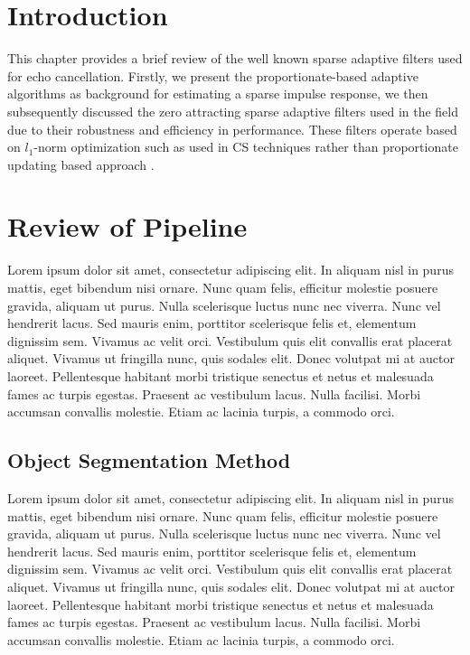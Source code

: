 \section{Introduction}\label{sec:4.1}
\vspace{-0.5cm}
\noindent This chapter provides a brief review of the well known sparse adaptive filters used for echo cancellation. Firstly, we present the proportionate-based adaptive algorithms as background for estimating a sparse impulse response, we then subsequently discussed the zero attracting sparse adaptive filters used in the field due to their robustness and efficiency in performance. These filters operate based on $l_1$-norm optimization such as used in CS techniques \cite{Dohono} rather than proportionate updating based approach \cite{Duttweiler}.

\vspace{-0.3cm}




\section{Review of Pipeline}\label{sec:4.2}
\vspace{-0.5cm}
\noindent Lorem ipsum dolor sit amet, consectetur adipiscing elit. In aliquam nisl in purus mattis, eget bibendum nisi ornare. Nunc quam felis, efficitur molestie posuere gravida, aliquam ut purus. Nulla scelerisque luctus nunc nec viverra. Nunc vel hendrerit lacus. Sed mauris enim, porttitor scelerisque felis et, elementum dignissim sem. Vivamus ac velit orci. Vestibulum quis elit convallis erat placerat aliquet. Vivamus ut fringilla nunc, quis sodales elit. Donec volutpat mi at auctor laoreet. Pellentesque habitant morbi tristique senectus et netus et malesuada fames ac turpis egestas. Praesent ac vestibulum lacus. Nulla facilisi. Morbi accumsan convallis molestie. Etiam ac lacinia turpis, a commodo orci.

\vspace{-0.3cm}

\subsection{Object Segmentation Method}\label{sec:4.2.1}
\vspace{-0.5cm}
\noindent  Lorem ipsum dolor sit amet, consectetur adipiscing elit. In aliquam nisl in purus mattis, eget bibendum nisi ornare. Nunc quam felis, efficitur molestie posuere gravida, aliquam ut purus. Nulla scelerisque luctus nunc nec viverra. Nunc vel hendrerit lacus. Sed mauris enim, porttitor scelerisque felis et, elementum dignissim sem. Vivamus ac velit orci. Vestibulum quis elit convallis erat placerat aliquet. Vivamus ut fringilla nunc, quis sodales elit. Donec volutpat mi at auctor laoreet. Pellentesque habitant morbi tristique senectus et netus et malesuada fames ac turpis egestas. Praesent ac vestibulum lacus. Nulla facilisi. Morbi accumsan convallis molestie. Etiam ac lacinia turpis, a commodo orci.



